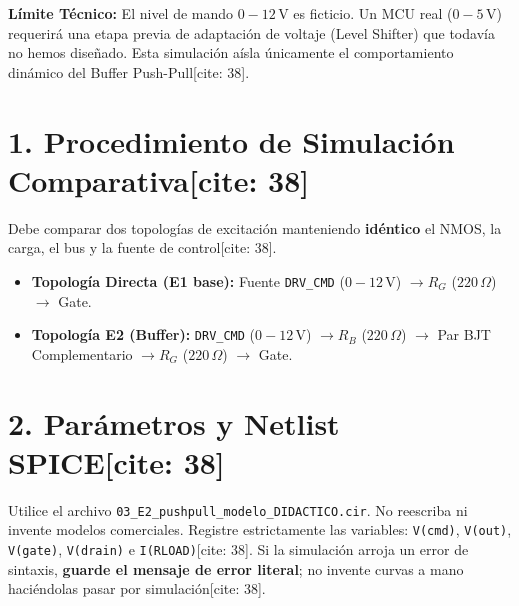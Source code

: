 \documentclass[11pt, a4paper]{article}
\begin{document}
\begin{tcolorbox}[colback=orange!10, colframe=orange, title=\textbf{Referencia E2: Simulación Pedagógica de Buffer (NO FABRICABLE)[cite: 38]}]
    \textbf{Límite Técnico:} El nivel de mando $0-12\,\text{V}$ es ficticio. Un MCU real ($0-5\,\text{V}$) requerirá una etapa previa de adaptación de voltaje (Level Shifter) que todavía no hemos diseñado. Esta simulación aísla únicamente el comportamiento dinámico del Buffer Push-Pull[cite: 38].
\end{tcolorbox}

\section*{1. Procedimiento de Simulación Comparativa[cite: 38]}
Debe comparar dos topologías de excitación manteniendo \textbf{idéntico} el NMOS, la carga, el bus y la fuente de control[cite: 38].
\begin{itemize}
    \setlength\itemsep{0.2em}
    \item \textbf{Topología Directa (E1 base):} Fuente \texttt{DRV\_CMD} ($0-12\,\text{V}$) $\to R_G$ ($220\,\Omega$) $\to$ Gate.
    \item \textbf{Topología E2 (Buffer):} \texttt{DRV\_CMD} ($0-12\,\text{V}$) $\to R_B$ ($220\,\Omega$) $\to$ Par BJT Complementario $\to R_G$ ($220\,\Omega$) $\to$ Gate.
\end{itemize}

\section*{2. Parámetros y Netlist SPICE[cite: 38]}
Utilice el archivo \texttt{03\_E2\_pushpull\_modelo\_DIDACTICO.cir}. No reescriba ni invente modelos comerciales. Registre estrictamente las variables: \texttt{V(cmd)}, \texttt{V(out)}, \texttt{V(gate)}, \texttt{V(drain)} e \texttt{I(RLOAD)}[cite: 38].
Si la simulación arroja un error de sintaxis, \textbf{guarde el mensaje de error literal}; no invente curvas a mano haciéndolas pasar por simulación[cite: 38].
\end{document}
